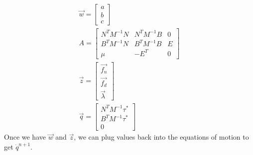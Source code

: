 \begin{equation}
\label{eq:slcp1}
\begin{array}{cc}
\vec{w} = \left[\begin{matrix}a \\ b \\ c\end{matrix}\right] \\
A = \left[\begin{matrix}N^TM^{-1}N & N^TM^{-1}B & 0 \\ B^TM^{-1}N & B^TM^{-1}B & E \\ \mu & -E^T & 0\end{matrix}\right] \\
\vec{z} = \left[\begin{matrix}\vec{f_n} \\ \vec{f_d} \\ \vec{\lambda}\end{matrix}\right] \\
\vec{q} = \left[\begin{matrix}N^TM^{-1}\tau^* \\ B^TM^{-1}\tau^* \\ 0\end{matrix}\right]
\end{array}
\end{equation}
Once we have $\vec{w}$ and $\vec{z}$, we can plug values back into the equations of motion to get $\dot{q}^{n + 1}$.